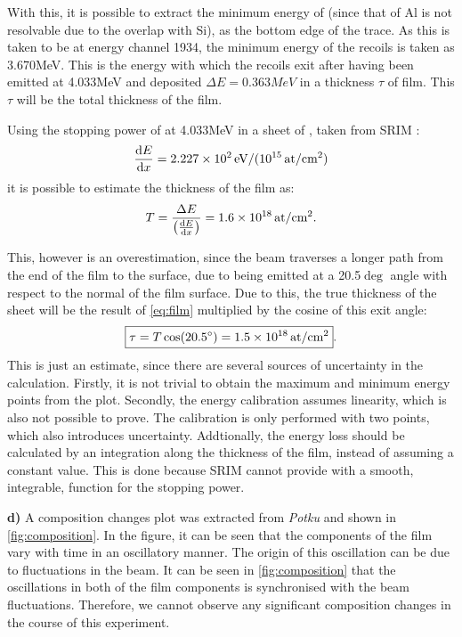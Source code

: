 With this, it is possible to extract the minimum energy of  (since that of Al is not resolvable due to the overlap with Si), as the bottom edge of the  trace. As this is taken to be at energy channel 1934, the minimum energy of the  recoils is taken as 3.670\unit{MeV}. This is the energy with which the  recoils exit after having been emitted at 4.033\unit{MeV} and deposited $\Delta E = 0.363\unit{MeV}$ in a thickness $\tau$ of film. This $\tau$ will be the total thickness of the film. 

Using the stopping power of  at 4.033\unit{MeV} in a sheet of , taken from SRIM \cite{srim}: $$\frac{\text{d} E}{\text{d} x} = 2.227\times 10^{2}\,\text{eV/(10$^{15}$\,at/cm$^2$)}$$ it is possible to estimate the thickness of the film as:
\begin{equation}
    \label{eq:film}
    T = \frac{\Delta E}{\left(\frac{\text{d} E}{\text{d} x}\right)} = 1.6\times 10^{18}\,\text{at/cm$^2$}.
\end{equation}

This, however is an overestimation, since the beam traverses a longer path from the end of the film to the surface, due to being emitted at a 20.5$\deg$ angle with respect to the normal of the film surface. Due to this, the true thickness of the sheet will be the result of \autoref{eq:film} multiplied by the cosine of this exit angle:
\begin{equation}
    \label{eq:filmcos}
    \boxed{\tau = T\cos(20.5^{\circ}) = 1.5\times 10^{18}\,\text{at/cm$^2$}}.
\end{equation}
This is just an estimate, since there are several sources of uncertainty in the calculation. Firstly, it is not trivial to obtain the maximum and minimum energy points from the plot. Secondly, the energy calibration assumes linearity, which is also not possible to prove. The calibration is only performed with two points, which also introduces uncertainty. Addtionally, the energy loss should be calculated by an integration along the thickness of the film, instead of assuming a constant value. This is done because SRIM cannot provide with a smooth, integrable, function for the stopping power. 
\newpage

\textbf{d)} A composition changes plot was extracted from \textit{Potku} and shown in \autoref{fig:composition}. In the figure, it can be seen that the components of the film vary with time in an oscillatory manner. The origin of this oscillation can be due to fluctuations in the beam. It can be seen in \autoref{fig:composition} that the oscillations in both of the film components is synchronised with the beam fluctuations. Therefore, we cannot observe any significant composition changes in the course of this experiment.

